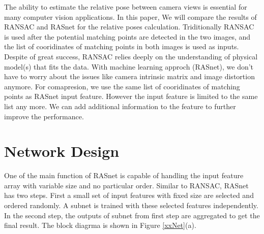 \documentclass{article}
\begin{document}
The ability to estimate the relative pose between camera views is essential for many computer vision applications. In this paper, We will compare the results of RANSAC and RASnet for the relative poses calculation. 
Triditionally RANSAC is used after the potential matching points are detected in the two images, and
the list of cooridinates of matching points in both images is used as inputs.
Despite of great success, RANSAC relies deeply on the understanding of physical model(s) that fits the data. With machine learning approch (RASnet), we don’t have to worry about the issues like camera intrinsic matrix and image distortion anymore. 
For comapresion, we use the same list of cooridinates of matching points as RASnet input feature. However 
the input feature is limited to the same list any more. We can add additional information to the feature to further improve the performance. 


%
%



\section{Network Design}
One of the main function of RASnet is capable of handling the input feature array with variable size and no particular order. Similar to RANSAC, RASnet has two steps. First a small set of input features with fixed size are selected and ordered randomly. A subnet is trained with these selected features independently. In the second step, the outputs of subnet from first step are aggregated to get the final result. The block diagrma is shown in Figure \ref{xxNet}(a).
\end{document}
